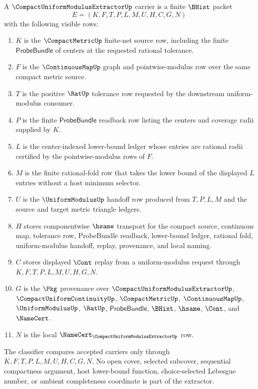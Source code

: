 \begin{definition}
\label{def:compact-uniform-modulus-extractor-carrier}
A $\CompactUniformModulusExtractorUp$ carrier is a finite $\BHist$ packet
$$
E=(K,F,T,P,L,M,U,H,C,G,N)
$$
with the following visible rows:
\begin{enumerate}
\item $K$ is the $\CompactMetricUp$ finite-net source row, including the finite $\mathsf{ProbeBundle}$ of centers at the requested rational tolerance.
\item $F$ is the $\ContinuousMapUp$ graph and pointwise-modulus row over the same compact metric source.
\item $T$ is the positive $\RatUp$ tolerance row requested by the downstream uniform-modulus consumer.
\item $P$ is the finite $\mathsf{ProbeBundle}$ readback row listing the centers and coverage radii supplied by $K$.
\item $L$ is the center-indexed lower-bound ledger whose entries are rational radii certified by the pointwise-modulus rows of $F$.
\item $M$ is the finite rational-fold row that takes the lower bound of the displayed $L$ entries without a host minimum selector.
\item $U$ is the $\UniformModulusUp$ handoff row produced from $T,P,L,M$ and the source and target metric triangle ledgers.
\item $H$ stores componentwise $\hsame$ transport for the compact source, continuous map, tolerance row, ProbeBundle readback, lower-bound ledger, rational fold, uniform-modulus handoff, replay, provenance, and local naming.
\item $C$ stores displayed $\Cont$ replay from a uniform-modulus request through $K,F,T,P,L,M,U,H,G,N$.
\item $G$ is the $\Pkg$ provenance over $\CompactUniformModulusExtractorUp$, $\CompactUniformContinuityUp$, $\CompactMetricUp$, $\ContinuousMapUp$, $\UniformModulusUp$, $\RatUp$, $\mathsf{ProbeBundle}$, $\BHist$, $\hsame$, $\Cont$, and $\NameCert$.
\item $N$ is the local $\NameCert_{\CompactUniformModulusExtractorUp}$ row.
\end{enumerate}
The classifier compares accepted carriers only through $K,F,T,P,L,M,U,H,C,G,N$. No open cover, selected subcover, sequential compactness argument, host lower-bound function, choice-selected Lebesgue number, or ambient completeness coordinate is part of the extractor.
\end{definition}

